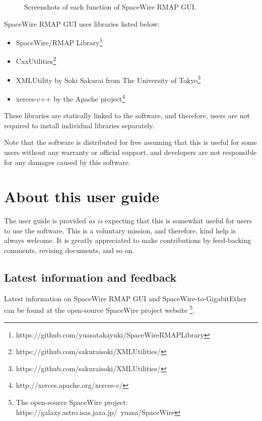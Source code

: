 \documentclass[a4paper,10pt]{article}
\begin{document}
\begin{figure}[htb]
\caption{Screenshots of each function of SpaceWire RMAP GUI.}
\label{figure:tab_rmap}
\end{figure}

SpaceWire RMAP GUI uses libraries listed below:
\begin{itemize}
  \setlength{\parskip}{0cm}
  \setlength{\itemsep}{0cm}
\item SpaceWire/RMAP Library\footnote{https://github.com/yuasatakayuki/SpaceWireRMAPLibrary}
\item CxxUtilities\footnote{https://github.com/sakuraisoki/XMLUtilities/}
\item XMLUtility by Soki Sakurai from The University of Tokyo\footnote{https://github.com/sakuraisoki/XMLUtilities/}
\item xerces-c++ by the Apache project\footnote{http://xerces.apache.org/xerces-c/}
\end{itemize}
These libraries are statically linked to the software, and therefore, users are not required to install individual libraries separately.

Note that the software is distributed for free assuming that this is useful for some users without any warranty or official support, and developers are not responsible for any damages caused by this software.

\clearpage

\section{About this user guide}
The user guide is provided {\it as is} expecting that this is somewhat useful for users to use the software. This is a voluntary mission, and therefore, kind help is always welcome. It is greatly appreciated to make contributions by feed-backing comments, revising documents, and so on.

\subsection{Latest information and feedback}
Latest information on SpaceWire RMAP GUI and SpaceWire-to-GigabitEther can be found at the open-source SpaceWire project website \footnote{The open-source SpaceWire project: https://galaxy.astro.isas.jaxa.jp/~yuasa/SpaceWire\label{url:supportpage}}.
\end{document}
